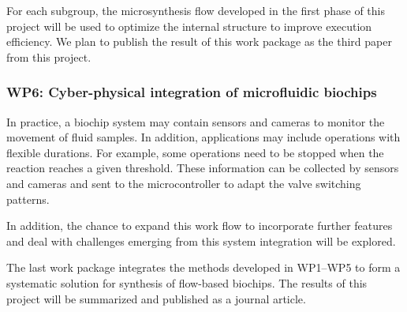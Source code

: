 For each subgroup, the microsynthesis flow developed in the first phase of this
project will be used to optimize the internal structure 
to improve execution efficiency.  
We plan to publish the result of this work package as the third paper from
this project.

%

\subsubsection{WP6: Cyber-physical integration of microfluidic biochips}

In practice, a biochip system may contain sensors and cameras to monitor the
movement of fluid samples. In addition, applications may include
operations with flexible durations. For example, some operations need to be stopped
when the reaction reaches a given threshold. These information can be
collected by sensors and cameras and sent to the microcontroller to adapt the
valve switching patterns. 

In addition, the chance to expand this work flow to incorporate further
features and deal with challenges emerging from this system integration will
be explored.


The last work package integrates the methods developed in WP1--WP5 to form a
systematic solution for synthesis of flow-based biochips. The results of this
project will be summarized and published as a journal article. 

